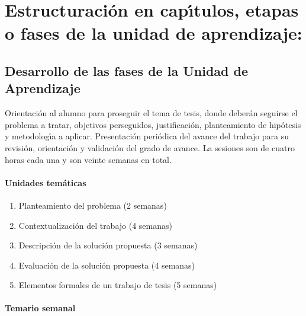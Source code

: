 \section{Estructuraci\'{o}n en cap\'{\i}tulos, etapas o fases de la unidad de
  aprendizaje:}

\subsection{Desarrollo de las fases de la Unidad de Aprendizaje}

\quad

Orientaci\'{o}n al alumno para proseguir el tema de tesis, donde
deber\'{a}n seguirse el problema a tratar, objetivos perseguidos,
justificaci\'{o}n, planteamiento de hip\'{o}tesis y metodolog\'{\i}a a
aplicar.  Presentaci\'{o}n peri\'{o}dica del avance del trabajo para
su revisi\'{o}n, orientaci\'{o}n y validaci\'{o}n del grado de
avance. La sesiones son de cuatro horas cada una y son veinte semanas
en total.

\paragraph{Unidades tem\'{a}ticas}

\quad

\begin{enumerate}[itemsep=-2pt]
\item Planteamiento del problema (2 semanas)
\item Contextualizaci\'{o}n del trabajo (4 semanas)
\item Descripci\'{o}n de la soluci\'{o}n propuesta (3 semanas)
\item Evaluaci\'{o}n de la soluci\'{o}n propuesta (4 semanas)
\item Elementos formales de un trabajo de tesis (5 semanas)
\end{enumerate}

\newpage

\paragraph{Temario semanal}

\quad
